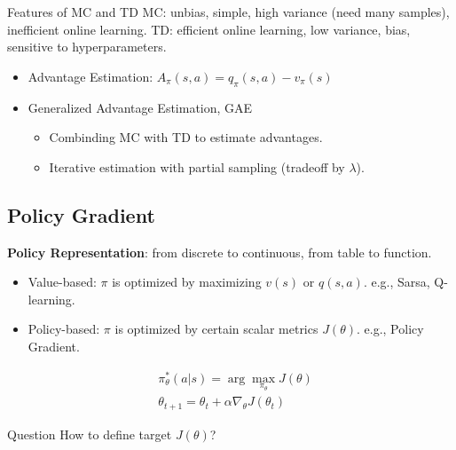 \begin{frame}
    \begin{block}{Features of MC and TD}
        MC: unbias, simple, high variance (need many samples), inefficient online learning.
        TD: efficient online learning, low variance, bias, sensitive to hyperparameters.
    \end{block}
    \begin{itemize}
        \item Advantage Estimation: $A_\pi(s,a) = q_\pi(s, a) - v_\pi(s)$
        \item Generalized Advantage Estimation, GAE
        \begin{itemize}
            \item Combinding MC with TD to estimate advantages.
            \item Iterative estimation with partial sampling (tradeoff by $\lambda$).
        \end{itemize}
    \end{itemize}
\end{frame}

\subsection{Policy Gradient}
\begin{frame}
    \textbf{Policy Representation}: from discrete to continuous, from table to function. 
    \begin{itemize}
        \item Value-based: $\pi$ is optimized by maximizing $v(s)$ or $q(s,a)$. 
            e.g., Sarsa, Q-learning.
        \item Policy-based: $\pi$ is optimized by certain scalar metrics $J(\theta)$.
            e.g., Policy Gradient.
    \end{itemize}
    \begin{align*}
        &\pi_{\theta}^*(a|s) = \arg \max_{\pi_\theta} J(\theta) \\
        &\theta_{t+1} = \theta_t + \alpha \nabla_\theta J(\theta_t)
    \end{align*}

    \begin{block}{Question}
        How to define target $J(\theta)$?
    \end{block}
\end{frame}

